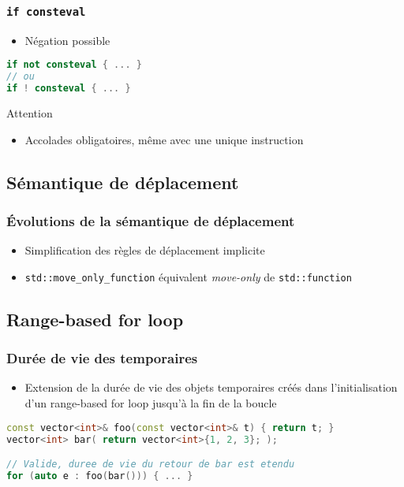 \documentclass[C++.tex]{subfiles}
\begin{document}
\begin{frame}[fragile]
	\frametitle{\lstinline|if consteval|}
	\begin{itemize}
		\item Négation possible
	\end{itemize}

	\begin{lstlisting}[language=C++]
if not consteval { ... }
// ou
if ! consteval { ... }\end{lstlisting}

	\begin{alertblock}{Attention}
		\begin{itemize}
			\item Accolades obligatoires, même avec une unique instruction
		\end{itemize}
	\end{alertblock}
\end{frame}

\subsection*{Sémantique de déplacement}
\begin{frame}[fragile]
	\frametitle{Évolutions de la sémantique de déplacement}
	\begin{itemize}
		\item Simplification des règles de déplacement implicite
		\item \lstinline|std::move_only_function| équivalent \textit{move-only} de \lstinline|std::function|
	\end{itemize}
\end{frame}

\subsection*{Range-based for loop}
\begin{frame}[fragile]
	\frametitle{Durée de vie des temporaires}
	\begin{itemize}
		\item Extension de la durée de vie des objets temporaires créés dans l'initialisation d'un range-based for loop jusqu'à la fin de la boucle
	\end{itemize}

	\begin{lstlisting}[language=C++]
const vector<int>& foo(const vector<int>& t) { return t; }
vector<int> bar( return vector<int>{1, 2, 3}; );

// Valide, duree de vie du retour de bar est etendu
for (auto e : foo(bar())) { ... }\end{lstlisting}
\end{frame}
\end{document}
